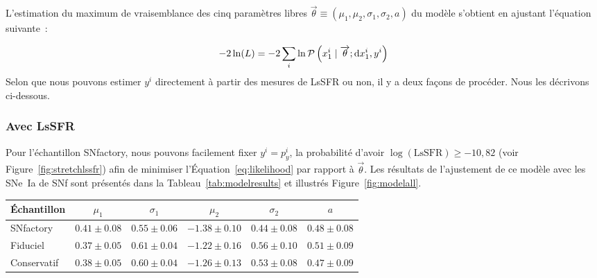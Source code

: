 \documentclass[../main/main.tex]{subfiles}
\begin{document}
L'estimation du maximum de vraisemblance des cinq paramètres libres
$\overrightarrow{\theta}\equiv({\mu_1, \mu_2, \sigma_1, \sigma_2,a})$ du modèle
s'obtient en ajustant l'équation suivante~:

\begin{equation}\label{eq:likelihood}
    -2\ln(L) = -2 \sum_i \ln \mathcal{P}\left(x_1^i \mid \overrightarrow{\theta};
    \mathrm{d}x_1^i, y^i\right)
\end{equation}
Selon que nous pouvons estimer $y^i$ directement à partir des mesures de LsSFR
ou non, il y a deux façons de procéder. Nous les décrivons ci-dessous.

\subsubsection*{Avec LsSFR}\label{sssec:lssfr}

Pour l'échantillon SNfactory, nous pouvons facilement fixer $y^i = p_y^i$, la
probabilité d'avoir $\log(\mathrm{LsSFR}) \geq -10,82$ (voir
Figure~\ref{fig:stretchlssfr}) afin de minimiser l'Équation~\ref{eq:likelihood}
par rapport à $\overrightarrow{\theta}$. Les résultats de l'ajustement de ce
modèle avec les SNe~Ia de SNf sont présentés dans la
Tableau~\ref{tab:modelresults} et illustrés Figure~\ref{fig:modelall}.

\begin{table*}
    \centering
    \caption[Valeurs des paramètres du modèle d'étirement de référence selon
    l'échantillon.]{Valeurs des paramètres issus des meilleurs ajustements du
        modèle de distribution de l'étirement de référence lorsqu'il est
        appliqué à l'ensemble de données de SNfactory seulement (114 SNe~Ia), à
        l'échantillon fiduciel (569 SNe~Ia) ou à l'échantillon conservatif
    (422).}
    \label{tab:modelresults}
    \begin{tabular}{lccccc}
        \toprule
        Échantillon & $\mu_1$             & $\sigma_1$
                    & $\mu_2$             & $\sigma_2$
                    & $a$ \\
        \midrule
        SNfactory   & $ 0.41 \pm 0.08$    & $0.55 \pm 0.06$
                    & $-1.38 \pm 0.10$    & $0.44 \pm 0.08$
                    & $ 0.48 \pm 0.08$ \\
        Fiduciel    & $ 0.37 \pm 0.05$    & $0.61 \pm 0.04$
                    & $-1.22 \pm 0.16$    & $0.56 \pm 0.10$
                    & $ 0.51 \pm 0.09$ \\
        Conservatif & $ 0.38 \pm 0.05$    & $0.60 \pm 0.04$
                    & $-1.26 \pm 0.13$    & $0.53 \pm 0.08$
                    & $ 0.47 \pm 0.09$ \\
        \bottomrule
    \end{tabular}
\end{table*}
\end{document}
